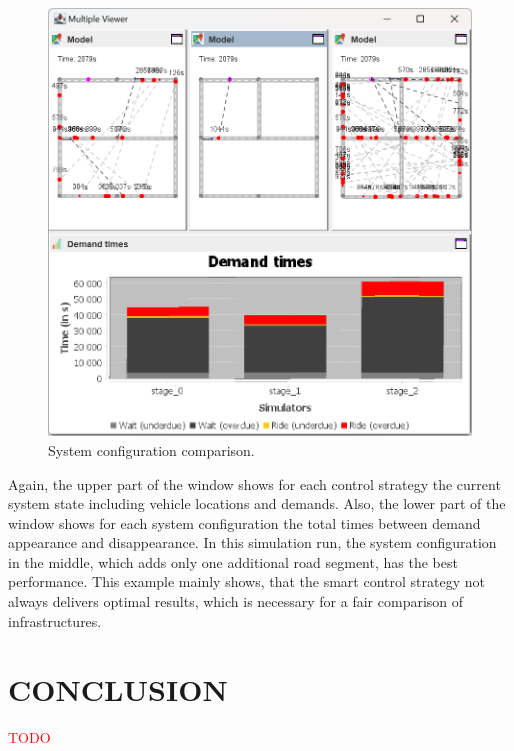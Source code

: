 \documentclass[a4paper,twoside]{article}
\begin{document}
	\begin{figure}[!ht]
		\includegraphics[width=\columnwidth]{infrastructure_comparison.png}
		\caption{System configuration comparison.}
		\label{fig:infratructure-comparison}
	\end{figure}
	
	Again, the upper part of the window shows for each control strategy the current system state including vehicle locations and demands.
	Also, the lower part of the window shows for each system configuration the total times between demand appearance and disappearance.
	In this simulation run, the system configuration in the middle, which adds only one additional road segment, has the best performance.
	This example mainly shows, that the smart control strategy not always delivers optimal results, which is necessary for a fair comparison of infrastructures.
	
	\section{\uppercase{Conclusion}}
	\label{sec:conclusion}
	
	\textcolor{red}{TODO}
	
	
	
	{\small
		}
	
	
\end{document}
